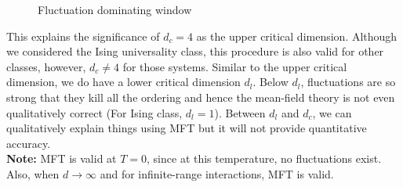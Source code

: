 \begin{figure}[H]
    \centering 
    
    \caption{Fluctuation dominating window}
\end{figure}
\noindent
This explains the significance of $d_c=4$ as the upper critical dimension. Although we considered the Ising universality class, this procedure is also valid for other classes, however, $d_c\neq 4$ for those systems. Similar to the upper critical dimension, we do have a lower critical dimension $d_l$. Below $d_l$, fluctuations are so strong that they kill all the ordering and hence the mean-field theory is not even qualitatively correct (For Ising class, $d_l=1$). Between $d_l$ and $d_c$, we can qualitatively explain things using MFT but it will not provide quantitative accuracy. \\[0.2cm]
\textbf{Note:} MFT is valid at $T=0$, since at this temperature, no fluctuations exist. Also, when $d\to \infty$ and for infinite-range interactions, MFT is valid. 